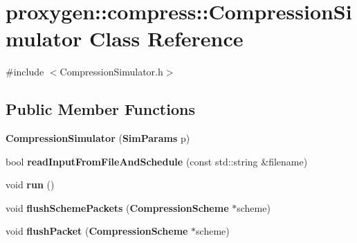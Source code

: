 \section{proxygen\+:\+:compress\+:\+:Compression\+Simulator Class Reference}
\label{classproxygen_1_1compress_1_1CompressionSimulator}


{\ttfamily \#include $<$Compression\+Simulator.\+h$>$}

\subsection*{Public Member Functions}
\begin{DoxyCompactItemize}
\item 
{\bf Compression\+Simulator} ({\bf Sim\+Params} p)
\item 
bool {\bf read\+Input\+From\+File\+And\+Schedule} (const std\+::string \&filename)
\item 
void {\bf run} ()
\item 
void {\bf flush\+Scheme\+Packets} ({\bf Compression\+Scheme} $\ast$scheme)
\item 
void {\bf flush\+Packet} ({\bf Compression\+Scheme} $\ast$scheme)
\end{DoxyCompactItemize}
